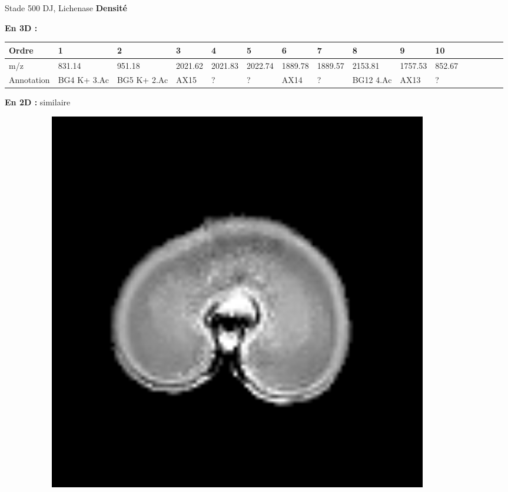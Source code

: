 \documentclass[10pt]{beamer}
\begin{document}
\begin{frame}{Stade 500 DJ, Lichenase}
  \textbf{Densité}
  
  \textbf{En 3D :}
  \vspace{-0.4cm}
    \begin{table}[]
    \centering
    \begin{adjustbox}{max width=1\textwidth}
      \begin{tabular}{llllllllllllllll}
        \toprule
        Ordre & 1       & 2       & 3       & 4       & 5       & 6       & 7       & 8       & 9       & 10       \\
        \midrule
        m/z &   831.14 & 951.18 & 2021.62 & 2021.83 & 2022.74 & 1889.78 & 1889.57 & 2153.81 & 1757.53 & 852.67 \\
        Annotation &  BG4 K+ 3.Ac & BG5 K+ 2.Ac & AX15 & ? & ? & AX14 & ? & BG12 4.Ac & AX13 & ?\\
        \bottomrule
      \end{tabular}
    \end{adjustbox}
  \end{table}


  \textbf{En 2D :} similaire

  \begin{figure}[ht]
    \centering
    \begin{subfigure}[t]{0.33\textwidth}
      \centering
      \includegraphics[width=0.9\textwidth]{fig/stats_500Lich_density_irm}


\end{subfigure}
\end{figure}
\end{frame}
\end{document}
